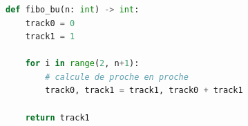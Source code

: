 \documentclass[svgnames,11pt]{beamer}
\begin{document}
\begin{frame}[fragile]
    \frametitle{}
\begin{center}
\begin{lstlisting}[language=Python , basicstyle=\ttfamily\small, xleftmargin=0.2em, xrightmargin=0em]
def fibo_bu(n: int) -> int:
    track0 = 0
    track1 = 1

    for i in range(2, n+1):
        # calcule de proche en proche
        track0, track1 = track1, track0 + track1

    return track1
\end{lstlisting}
\label{CODE}
\end{center}
\end{frame}
\end{document}
